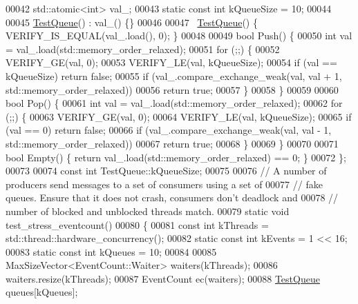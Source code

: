 \begin{DoxyCode}
00042   std::atomic<int> val\_;
00043   \textcolor{keyword}{static} \textcolor{keyword}{const} \textcolor{keywordtype}{int} kQueueSize = 10;
00044 
00045   \hyperlink{struct_test_queue}{TestQueue}() : val\_() \{\}
00046 
00047   ~\hyperlink{struct_test_queue}{TestQueue}() \{ VERIFY\_IS\_EQUAL(val\_.load(), 0); \}
00048 
00049   \textcolor{keywordtype}{bool} Push() \{
00050     \textcolor{keywordtype}{int} val = val\_.load(std::memory\_order\_relaxed);
00051     \textcolor{keywordflow}{for} (;;) \{
00052       VERIFY\_GE(val, 0);
00053       VERIFY\_LE(val, kQueueSize);
00054       \textcolor{keywordflow}{if} (val == kQueueSize) \textcolor{keywordflow}{return} \textcolor{keyword}{false};
00055       \textcolor{keywordflow}{if} (val\_.compare\_exchange\_weak(val, val + 1, std::memory\_order\_relaxed))
00056         \textcolor{keywordflow}{return} \textcolor{keyword}{true};
00057     \}
00058   \}
00059 
00060   \textcolor{keywordtype}{bool} Pop() \{
00061     \textcolor{keywordtype}{int} val = val\_.load(std::memory\_order\_relaxed);
00062     \textcolor{keywordflow}{for} (;;) \{
00063       VERIFY\_GE(val, 0);
00064       VERIFY\_LE(val, kQueueSize);
00065       \textcolor{keywordflow}{if} (val == 0) \textcolor{keywordflow}{return} \textcolor{keyword}{false};
00066       \textcolor{keywordflow}{if} (val\_.compare\_exchange\_weak(val, val - 1, std::memory\_order\_relaxed))
00067         \textcolor{keywordflow}{return} \textcolor{keyword}{true};
00068     \}
00069   \}
00070 
00071   \textcolor{keywordtype}{bool} Empty() \{ \textcolor{keywordflow}{return} val\_.load(std::memory\_order\_relaxed) == 0; \}
00072 \};
00073 
00074 \textcolor{keyword}{const} \textcolor{keywordtype}{int} TestQueue::kQueueSize;
00075 
00076 \textcolor{comment}{// A number of producers send messages to a set of consumers using a set of}
00077 \textcolor{comment}{// fake queues. Ensure that it does not crash, consumers don't deadlock and}
00078 \textcolor{comment}{// number of blocked and unblocked threads match.}
00079 \textcolor{keyword}{static} \textcolor{keywordtype}{void} test\_stress\_eventcount()
00080 \{
00081   \textcolor{keyword}{const} \textcolor{keywordtype}{int} kThreads = std::thread::hardware\_concurrency();
00082   \textcolor{keyword}{static} \textcolor{keyword}{const} \textcolor{keywordtype}{int} kEvents = 1 << 16;
00083   \textcolor{keyword}{static} \textcolor{keyword}{const} \textcolor{keywordtype}{int} kQueues = 10;
00084 
00085   MaxSizeVector<EventCount::Waiter> waiters(kThreads);
00086   waiters.resize(kThreads);
00087   EventCount ec(waiters);
00088   \hyperlink{struct_test_queue}{TestQueue} queues[kQueues];

\end{DoxyCode}
